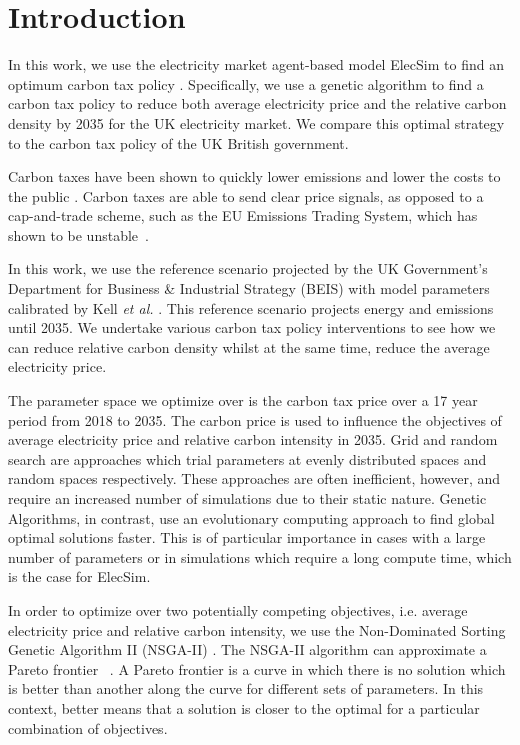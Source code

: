 \section{Introduction}
\label{carbonoptim:sec:intro}


In this work, we use the electricity market agent-based model ElecSim to find an optimum carbon tax policy \cite{Kell}. Specifically, we use a genetic algorithm to find a carbon tax policy to reduce both average electricity price and the relative carbon density by 2035 for the UK electricity market. We compare this optimal strategy to the carbon tax policy of the UK British government.

Carbon taxes have been shown to quickly lower emissions and lower the costs to the public \cite{Wittneben2009}. Carbon taxes are able to send clear price signals, as opposed to a cap-and-trade scheme, such as the EU Emissions Trading System, which has shown to be unstable~\cite{Wittneben2009}.

In this work, we use the reference scenario projected by the UK Government's Department for Business \& Industrial Strategy (BEIS) with model parameters calibrated by Kell \textit{et al.} \cite{DBEIS2019,Kell2020}. This reference scenario projects energy and emissions until 2035. We undertake various carbon tax policy interventions to see how we can reduce relative carbon density whilst at the same time, reduce the average electricity price.


The parameter space we optimize over is the carbon tax price over a 17 year period from 2018 to 2035. The carbon price is used to influence the objectives of average electricity price and relative carbon intensity in 2035. Grid and random search are approaches which trial parameters at evenly distributed spaces and random spaces respectively. These approaches are often inefficient, however, and require an increased number of simulations due to their static nature. Genetic Algorithms, in contrast, use an evolutionary computing approach to find global optimal solutions faster. This is of particular importance in cases with a large number of parameters or in simulations which require a long compute time, which is the case for ElecSim.

In order to optimize over two potentially competing objectives, i.e. average electricity price and relative carbon intensity, we use the Non-Dominated Sorting Genetic Algorithm II (NSGA-II) \cite{Valkanas2014}. The NSGA-II algorithm can approximate a Pareto frontier ~\cite{Pareto1927, Stadler1979}. A Pareto frontier is a curve in which there is no solution which is better than another along the curve for different sets of parameters. In this context, better means that a solution is closer to the optimal for a particular combination of objectives.

